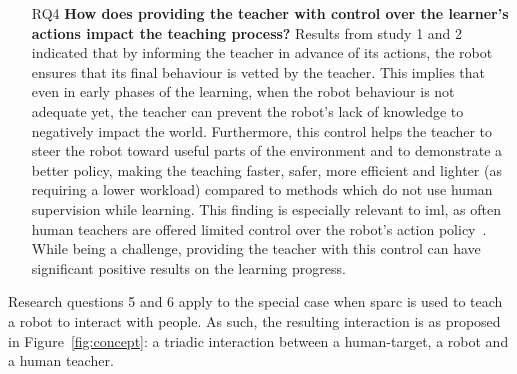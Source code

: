 \begin{itemize}
	\item [RQ4] \textbf{How does providing the teacher with control over the learner's actions impact the teaching process?} 
	Results from study 1 and 2 indicated that by informing the teacher in advance of its actions, the robot ensures that its final behaviour is vetted by the teacher. This implies that even in early phases of the learning, when the robot behaviour is not adequate yet, the teacher can prevent the robot's lack of knowledge to negatively impact the world. Furthermore, this control helps the teacher to steer the robot toward useful parts of the environment and to demonstrate a better policy, making the teaching faster, safer, more efficient and lighter (as requiring a lower workload) compared to methods which do not use human supervision while learning. This finding is especially relevant to \gls{iml}, as often human teachers are offered limited control over the robot's action policy~\citep{thomaz2008teachable,knox2009interactively}. While being a challenge, providing the teacher with this control can have significant positive results on the learning progress.
\end{itemize}

Research questions 5 and 6 apply to the special case when \gls{sparc} is used to teach a robot to interact with people. As such, the resulting interaction is as proposed in Figure~\ref{fig:concept}: a triadic interaction between a human-target, a robot and a human teacher.

